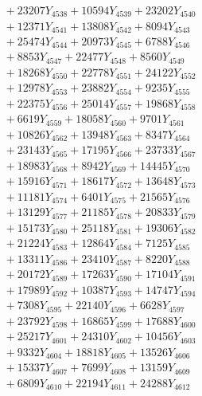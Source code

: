 \documentclass[a4paper,10pt]{article}
\begin{document}
{\begin{align}
&\;  + 23207 Y_{4538} + 10594 Y_{4539} + 23202 Y_{4540} \\[0.3ex]
&\;  + 12371 Y_{4541} + 13808 Y_{4542} + 8094 Y_{4543} \\[0.3ex]
&\;  + 25474 Y_{4544} + 20973 Y_{4545} + 6788 Y_{4546} \\[0.3ex]
&\;  + 8853 Y_{4547} + 22477 Y_{4548} + 8560 Y_{4549} \\[0.3ex]
&\;  + 18268 Y_{4550} + 22778 Y_{4551} + 24122 Y_{4552} \\[0.3ex]
&\;  + 12978 Y_{4553} + 23882 Y_{4554} + 9235 Y_{4555} \\[0.3ex]
&\;  + 22375 Y_{4556} + 25014 Y_{4557} + 19868 Y_{4558} \\[0.5ex]\allowbreak
&\;  + 6619 Y_{4559} + 18058 Y_{4560} + 9701 Y_{4561} \\[0.3ex]
&\;  + 10826 Y_{4562} + 13948 Y_{4563} + 8347 Y_{4564} \\[0.3ex]
&\;  + 23143 Y_{4565} + 17195 Y_{4566} + 23733 Y_{4567} \\[0.3ex]
&\;  + 18983 Y_{4568} + 8942 Y_{4569} + 14445 Y_{4570} \\[0.3ex]
&\;  + 15916 Y_{4571} + 18617 Y_{4572} + 13648 Y_{4573} \\[0.3ex]
&\;  + 11181 Y_{4574} + 6401 Y_{4575} + 21565 Y_{4576} \\[0.3ex]
&\;  + 13129 Y_{4577} + 21185 Y_{4578} + 20833 Y_{4579} \\[0.3ex]
&\;  + 15173 Y_{4580} + 25118 Y_{4581} + 19306 Y_{4582} \\[0.3ex]
&\;  + 21224 Y_{4583} + 12864 Y_{4584} + 7125 Y_{4585} \\[0.3ex]
&\;  + 13311 Y_{4586} + 23410 Y_{4587} + 8220 Y_{4588} \\[0.5ex]\allowbreak
&\;  + 20172 Y_{4589} + 17263 Y_{4590} + 17104 Y_{4591} \\[0.3ex]
&\;  + 17989 Y_{4592} + 10387 Y_{4593} + 14747 Y_{4594} \\[0.3ex]
&\;  + 7308 Y_{4595} + 22140 Y_{4596} + 6628 Y_{4597} \\[0.3ex]
&\;  + 23792 Y_{4598} + 16865 Y_{4599} + 17688 Y_{4600} \\[0.3ex]
&\;  + 25217 Y_{4601} + 24310 Y_{4602} + 10456 Y_{4603} \\[0.3ex]
&\;  + 9332 Y_{4604} + 18818 Y_{4605} + 13526 Y_{4606} \\[0.3ex]
&\;  + 15337 Y_{4607} + 7699 Y_{4608} + 13159 Y_{4609} \\[0.3ex]
&\;  + 6809 Y_{4610} + 22194 Y_{4611} + 24288 Y_{4612} \\[0.3ex]

\end{align}}
\end{document}
